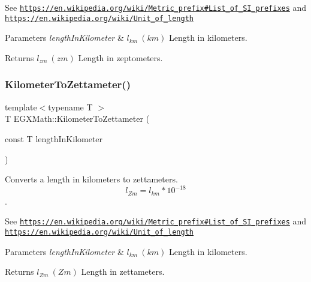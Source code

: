 See \href{https://en.wikipedia.org/wiki/Metric_prefix#List_of_SI_prefixes}{\tt https\+://en.\+wikipedia.\+org/wiki/\+Metric\+\_\+prefix\#\+List\+\_\+of\+\_\+\+S\+I\+\_\+prefixes} and \href{https://en.wikipedia.org/wiki/Unit_of_length}{\tt https\+://en.\+wikipedia.\+org/wiki/\+Unit\+\_\+of\+\_\+length} 
\begin{DoxyParams}{Parameters}
{\em length\+In\+Kilometer} & $ l_{km}\ (km)$ Length in kilometers. \\
\hline
\end{DoxyParams}
\begin{DoxyReturn}{Returns}
$ l_{zm}\ (zm)$ Length in zeptometers. 
\end{DoxyReturn}
\mbox{\label{group___e_g_x_math-_conversions-_length_conversions-_s_i-_kilometer-_s_i_ga85792ebcdaa5c8289da781417c88963d}} 
\subsubsection{\texorpdfstring{Kilometer\+To\+Zettameter()}{KilometerToZettameter()}}
{\footnotesize\ttfamily template$<$typename T $>$ \\
T E\+G\+X\+Math\+::\+Kilometer\+To\+Zettameter (\begin{DoxyParamCaption}\item[{const T}]{length\+In\+Kilometer }\end{DoxyParamCaption})}



Converts a length in kilometers to zettameters. \[ l_{Zm}=l_{km} * 10^{-18} \]. 

See \href{https://en.wikipedia.org/wiki/Metric_prefix#List_of_SI_prefixes}{\tt https\+://en.\+wikipedia.\+org/wiki/\+Metric\+\_\+prefix\#\+List\+\_\+of\+\_\+\+S\+I\+\_\+prefixes} and \href{https://en.wikipedia.org/wiki/Unit_of_length}{\tt https\+://en.\+wikipedia.\+org/wiki/\+Unit\+\_\+of\+\_\+length} 
\begin{DoxyParams}{Parameters}
{\em length\+In\+Kilometer} & $ l_{km}\ (km)$ Length in kilometers. \\
\hline
\end{DoxyParams}
\begin{DoxyReturn}{Returns}
$ l_{Zm}\ (Zm)$ Length in zettameters. 
\end{DoxyReturn}
